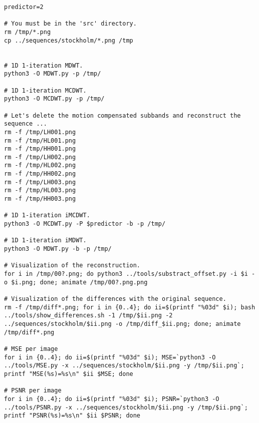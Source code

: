 \begin{verbatim}
predictor=2

# You must be in the 'src' directory.
rm /tmp/*.png
cp ../sequences/stockholm/*.png /tmp


# 1D 1-iteration MDWT.
python3 -O MDWT.py -p /tmp/

# 1D 1-iteration MCDWT.
python3 -O MCDWT.py -p /tmp/

# Let's delete the motion compensated subbands and reconstruct the sequence ...
rm -f /tmp/LH001.png
rm -f /tmp/HL001.png
rm -f /tmp/HH001.png
rm -f /tmp/LH002.png
rm -f /tmp/HL002.png
rm -f /tmp/HH002.png
rm -f /tmp/LH003.png
rm -f /tmp/HL003.png
rm -f /tmp/HH003.png

# 1D 1-iteration iMCDWT.
python3 -O MCDWT.py -P $predictor -b -p /tmp/

# 1D 1-iteration iMDWT.
python3 -O MDWT.py -b -p /tmp/

# Visualization of the reconstruction.
for i in /tmp/00?.png; do python3 ../tools/substract_offset.py -i $i -o $i.png; done; animate /tmp/00?.png.png

# Visualization of the differences with the original sequence.
rm -f /tmp/diff*.png; for i in {0..4}; do ii=$(printf "%03d" $i); bash ../tools/show_differences.sh -1 /tmp/$ii.png -2 ../sequences/stockholm/$ii.png -o /tmp/diff_$ii.png; done; animate /tmp/diff*.png

# MSE per image
for i in {0..4}; do ii=$(printf "%03d" $i); MSE=`python3 -O ../tools/MSE.py -x ../sequences/stockholm/$ii.png -y /tmp/$ii.png`; printf "MSE(%s)=%s\n" $ii $MSE; done

# PSNR per image
for i in {0..4}; do ii=$(printf "%03d" $i); PSNR=`python3 -O ../tools/PSNR.py -x ../sequences/stockholm/$ii.png -y /tmp/$ii.png`; printf "PSNR(%s)=%s\n" $ii $PSNR; done
\end{verbatim}


